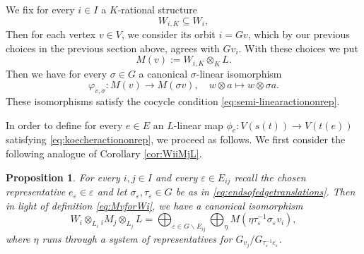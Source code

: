 \documentclass[a4paper,12pt,reqno]{amsart}
\theoremstyle{plain}
\newtheorem{proposition}[theorem]{Proposition}
\theoremstyle{remark}
\begin{document}
  We fix for every $i\in I$ a $K$-rational structure
  \begin{equation}
    W_{i,K}\subseteq W_i,
    \label{eq:KrationalWi}
  \end{equation}
  Then for each vertex $v \in V$, we consider its orbit $i=Gv$, which by our previous choices in the previous section above, agrees with $Gv_{i}$. With these choices we put
  \begin{equation}
    M(v) := W_{i,K}\otimes_{K}L.
    \label{eq:MvforWi}
  \end{equation}
  Then we have for every $\sigma\in G$ a canonical $\sigma$-linear isomorphism
  \begin{equation}
    \varphi_{v,\sigma}\colon M(v)\to M(\sigma v),\quad w\otimes a\mapsto w\otimes \sigma a.
    \label{eq:varphi2}
  \end{equation}
  These isomorphisms satisfy the cocycle condition \eqref{eq:semi-linearactiononrep}.

  In order to define for every $e\in E$ an $L$-linear map $\phi_e\colon V(s(t))\to V(t(e))$ satisfying \eqref{eq:koecheractiononrep}, we proceed as follows. We first consider the following analogue of Corollary \ref{cor:WiiMjL}.

  \begin{proposition}
    For every $i,j\in I$ and every $\varepsilon\in E_{ij}$ recall the chosen representative $e_\varepsilon\in\varepsilon$ and let $\sigma_\varepsilon,\tau_\varepsilon\in G$ be as in \eqref{eq:endsofedgetranslations}. Then in light of definition \eqref{eq:MvforWi}, we have a canonical isomorphism
    \begin{equation}
    W_i \otimes_{L_i} {}_iM_j\otimes_{L_j}L=
    \bigoplus_{\varepsilon\in G\backslash E_{ij}}
    \bigoplus_{\eta}
    M(\eta\tau_\varepsilon^{-1}\sigma_\varepsilon v_i),
    \label{eq:WiiMjL2}
    \end{equation}
    where $\eta$ runs through a system of representatives for $G_{v_j}/G_{\tau_\varepsilon^{-1}e_\varepsilon}$.
  \end{proposition}
\end{document}

